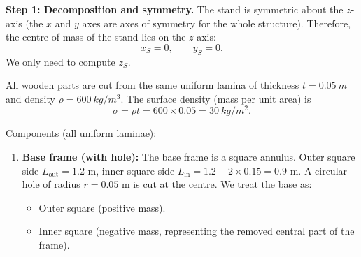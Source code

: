 \documentclass[11pt]{article}
\begin{document}
\begin{exoresolu}
\noindent\textbf{Step 1: Decomposition and symmetry.}
The stand is symmetric about the $z$-axis (the $x$ and $y$ axes are axes of symmetry for the whole structure). Therefore, the centre of mass of the stand lies on the $z$-axis:
\[
x_S = 0,\qquad y_S = 0.
\]
We only need to compute $z_S$.

All wooden parts are cut from the same uniform lamina of thickness $t = \SI{0.05}{m}$ and density $\rho = \SI{600}{kg/m^3}$. The surface density (mass per unit area) is
\[
\sigma = \rho t = 600 \times 0.05 = \SI{30}{kg/m^2}.
\]

Components (all uniform laminae):
\begin{enumerate}
    \item \textbf{Base frame (with hole):} The base frame is a square annulus. Outer square side $L_{\text{out}} = 1.2$ m, inner square side $L_{\text{in}} = 1.2 - 2\times0.15 = 0.9$ m. A circular hole of radius $r = 0.05$ m is cut at the centre. We treat the base as:
    \begin{itemize}
        \item Outer square (positive mass).
        \item Inner square (negative mass, representing the removed central part of the frame).

\end{itemize}
\end{enumerate}
\end{exoresolu}
\end{document}
